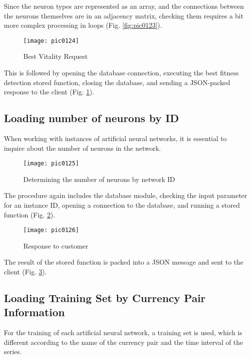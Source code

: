 Since the neuron types are represented as an array, and the connections between the neurons themselves are in an adjacency matrix, checking them requires a bit more complex processing in loops (Fig. \ref{fig:pic0123}).

\begin{figure}[h]
\centering
\texttt{[image: pic0124]}
\caption{Best Vitality Request}
\label{fig:pic0124}
\end{figure}
\FloatBarrier

This is followed by opening the database connection, executing the best fitness detection stored function, closing the database, and sending a JSON-packed response to the client (Fig. \ref{fig:pic0124}).

\subsection{Loading number of neurons by ID}

When working with instances of artificial neural networks, it is essential to inquire about the number of neurons in the network.

\begin{figure}[h]
\centering
\texttt{[image: pic0125]}
\caption{Determining the number of neurons by network ID}
\label{fig:pic0125}
\end{figure}
\FloatBarrier

The procedure again includes the database module, checking the input parameter for an instance ID, opening a connection to the database, and running a stored function (Fig. \ref{fig:pic0125}).

\begin{figure}[h]
\centering
\texttt{[image: pic0126]}
\caption{Response to customer}
\label{fig:pic0126}
\end{figure}
\FloatBarrier

The result of the stored function is packed into a JSON message and sent to the client (Fig. \ref{fig:pic0126}).

\subsection{Loading Training Set by Currency Pair Information}

For the training of each artificial neural network, a training set is used, which is different according to the name of the currency pair and the time interval of the series.

